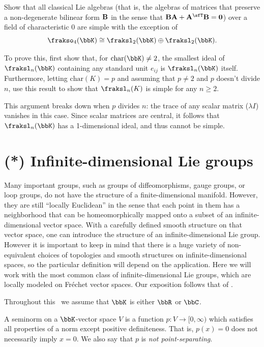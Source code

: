 \begin{xca}
    Show that all classical Lie algebras (that is, the algebras of matrices that preserve a non-degenerate bilinear form $\bf{B}$ in the sense that $\bf{B}A+A^\sfT \bf{B}=0$) over a field of characteristic 0 are simple with the exception of
    \[\frakso_4(\bbK)\cong \fraksl_2(\bbK)\oplus\fraksl_2(\bbK).\]

    To prove this, first show that, for $\mathrm{char}(\bbK)\neq 2$, the smallest ideal of $\fraksl_n(\bbK)$ containing any standard unit $e_{ij}$ is $\fraksl_n(\bbK)$ itself. Furthermore, letting $\mathrm{char}(K)=p$ and assuming that $p\neq 2$ and $p$ doesn't divide $n$, use this result to show that $\fraksl_n(K)$ is simple for any $n\geq 2$. 

    This argument breaks down when $p$ divides $n$: the trace of any scalar matrix ($\lambda I$) vanishes in this case. Since scalar matrices are central, it follows that $\fraksl_n(\bbK)$ has a 1-dimensional ideal, and thus cannot be simple.
\end{xca}






\section{(*) Infinite-dimensional Lie groups}\label{sec: inf-dim groups}


Many important groups, such as groups of diffeomorphisms, gauge groups, or loop groups, do not have the structure of a finite-dimensional manifold. However, they are still ``locally Euclidean'' in the sense that each point in them has a neighborhood that can be homeomorphically mapped onto a subset of an infinite-dimensional vector space. With a carefully defined smooth structure on that vector space, one can introduce the structure of an infinite-dimensional Lie group. However it is important to keep in mind that there is a huge variety of non-equivalent choices of topologies and smooth structures on infinite-dimensional spaces, so the particular definition will depend on the application. Here we will work with the most common class of infinite-dimensional Lie groups, which are locally modeled on Fr\'echet vector spaces. Our exposition follows that of \cite{Neeb}.

Throughout this \sect\  we assume that $\bbK$ is either $\bbR$ or $\bbC$.

\begin{defn}[Seminorm]
    A seminorm on a $\bbK$-vector space $V$ is a function $p:V\to [0,\infty)$ which satisfies all properties of a norm except positive definiteness. That is, $p(x)=0$ does not necessarily imply $x=0$. We also say that $p$ is \emph{not point-separating}.
\end{defn}

